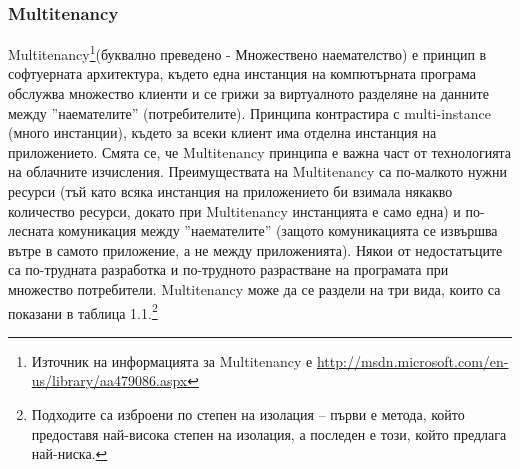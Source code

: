 \documentclass[pdftex,14pt,a4paper]{extreport}
\begin{document}
\subsubsection {Multitenancy}
Multitenancy\footnote{Източник на информацията за Multitenancy е \url{http://msdn.microsoft.com/en-us/library/aa479086.aspx}}(буквално преведено - Множествено наемателство) е принцип в софтуерната архитектура, където една инстанция на компютърната програма обслужва множество клиенти и се грижи за виртуалното разделяне на данните между ''наемателите'' (потребителите). Принципа контрастира с multi-instance (много инстанции), където за всеки клиент има отделна инстанция на приложението. Смята се, че Multitenancy принципа е важна част от технологията на облачните изчисления. Преимуществата на Multitenancy са по-малкото нужни ресурси (тъй като всяка инстанция на приложението би взимала някакво количество ресурси, докато при Multitenancy инстанцията е само една) и по-лесната комуникация между ''наемателите'' (защото комуникацията се извършва вътре в самото приложение, а не между приложенията). Някои от недостатъците са по-трудната разработка и по-трудното разрастване на програмата при множество потребители. Multitenancy може да се раздели на три вида, които са показани в таблица 1.1.\footnote{Подходите са изброени по степен на изолация -- първи е метода, който предоставя най-висока степен на изолация, а последен е този, който предлага най-ниска.}
\end{document}

